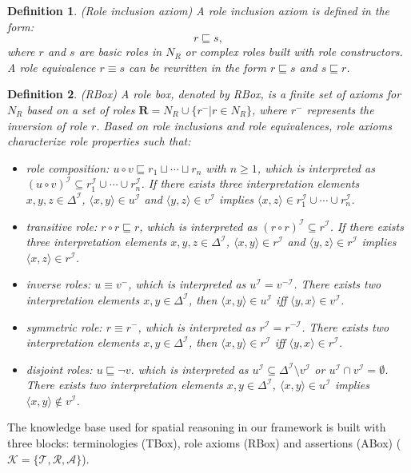 \documentclass{article}
\newtheorem{mydef}{Definition}
\begin{document}
\begin{mydef}(Role inclusion axiom) 
 A role inclusion axiom is defined in the form:
 $$r\sqsubseteq s,$$
 where $r$ and $s$ are basic roles in $N_R$ or complex roles built with role constructors. A role equivalence $r\equiv s$ can be rewritten in the form $r\sqsubseteq s$ and $s\sqsubseteq r$.
\end{mydef}
\begin{mydef}(RBox)
A role box, denoted by RBox, is a finite set
of axioms for $N_R$  based on a set of roles $\mathbf{R}=N_R\cup\{r^-| r\in N_R\}$, where $r^-$  represents the inversion of role $r$.
Based on role inclusions and role equivalences, role axioms characterize role properties such that:
\begin{itemize}
 \item role composition: $u\circ v \sqsubseteq r_1\sqcup \cdots\sqcup r_n$ with $n\geqslant 1$, which is interpreted as 
 $(u\circ v)^\mathcal{I} \subseteq r_1^\mathcal{I} \cup \cdots \cup r_n^\mathcal{I}$. If there exists three interpretation elements $x,y,z\in \Delta^\mathcal{I}$, 
 $\langle x,y \rangle \in u^\mathcal{I}$ and $\langle y,z \rangle \in v^\mathcal{I}$ implies  $\langle x,z \rangle \in r_1^\mathcal{I} \cup \cdots \cup r_n^\mathcal{I}$. 
 \item transitive role: $r\circ r \sqsubseteq r$, which is interpreted as $(r\circ r)^\mathcal{I} \subseteq r^\mathcal{I}$. If there exists three interpretation elements
 $x,y,z\in \Delta^\mathcal{I}$, $\langle x,y \rangle \in r^\mathcal{I}$ and $\langle y,z \rangle \in r^\mathcal{I}$ implies  $\langle x,z \rangle \in r^\mathcal{I}$.
 \item inverse roles: $u \equiv v^-$, which is interpreted as $u^\mathcal{I} = v^{-\mathcal{I}}$. There exists two interpretation elements  $x,y\in \Delta^\mathcal{I}$,
 then $\langle x,y \rangle \in u^\mathcal{I}$ iff $\langle y,x \rangle \in v^\mathcal{I}$.
 \item symmetric role: $r \equiv r^-$, which is interpreted as $r^\mathcal{I} = r^{-\mathcal{I}}$. There exists two interpretation elements  $x,y\in \Delta^\mathcal{I}$,
 then $\langle x,y \rangle \in r^\mathcal{I}$ iff $\langle y,x \rangle \in r^\mathcal{I}$.
 \item disjoint roles: $u\sqsubseteq \neg v$. which is interpreted as $u^\mathcal{I} \subseteq \Delta^\mathcal{I} \setminus v^\mathcal{I}$ or $u^\mathcal{I}\cap v^\mathcal{I}=\emptyset$. 
 There exists two interpretation elements  $x,y\in \Delta^\mathcal{I}$, 
$\langle x,y \rangle \in u^\mathcal{I}$ implies $\langle x,y \rangle \notin v^\mathcal{I}$.
\end{itemize}
\end{mydef}
The knowledge base used for spatial reasoning in our framework is built with three blocks: terminologies (TBox), role axioms (RBox) and assertions (ABox)
($\mathcal{K}=\{\mathcal{T},\mathcal{R},\mathcal{A}\}$).
\end{document}
